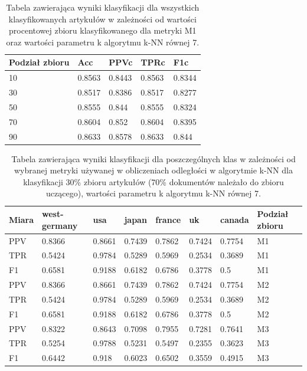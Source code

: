 \documentclass{classrep}
\begin{document}
\begin{table}[H]
    \centering
\caption{Tabela zawierająca wyniki klasyfikacji dla wszystkich klasyfikowanych artykułów w zależności od wartości procentowej zbioru
klasyfikowanego dla metryki M1 oraz wartości parametru k algorytmu k-NN równej 7.}
\begin{adjustbox}{max width=\textwidth}
    \begin{tabular}{|l|l|l|l|l|}
    \hline
        Podział zbioru & Acc & PPVc & TPRc & F1c \\ \hline
        10 & 0.8563 & 0.8443 & 0.8563 & 0.8344 \\ \hline
        30 & 0.8517 & 0.8386 & 0.8517 & 0.8277 \\ \hline
        50 & 0.8555 & 0.844 & 0.8555 & 0.8324 \\ \hline
        70 & 0.8604 & 0.852 & 0.8604 & 0.8395 \\ \hline
        90 & 0.8633 & 0.8578 & 0.8633 & 0.844 \\ \hline
    \end{tabular}
\end{adjustbox}
\end{table}

\begin{table}[H]
    \centering
\caption{Tabela zawierająca wyniki klasyfikacji dla poszczególnych klas w zależności od wybranej metryki
używanej w obliczeniach odległości w algorytmie k-NN dla klasyfikacji 30\% zbioru
artykułów (70\% dokumentów należało do zbioru uczącego), wartości parametru k
algorytmu k-NN równej 7.}
\begin{adjustbox}{max width=\textwidth}
    \begin{tabular}{|l|l|l|l|l|l|l|l|}
    \hline
        Miara & west-germany  & usa  & japan & france & uk & canada & Podział zbioru \\ \hline
        PPV & 0.8366 & 0.8661 & 0.7439 & 0.7862 & 0.7424 & 0.7754 & M1 \\ \hline
        TPR & 0.5424 & 0.9784 & 0.5289 & 0.5969 & 0.2534 & 0.3689 & M1 \\ \hline
        F1 & 0.6581 & 0.9188 & 0.6182 & 0.6786 & 0.3778 & 0.5 & M1 \\ \hline
        PPV & 0.8366 & 0.8661 & 0.7439 & 0.7862 & 0.7424 & 0.7754 & M2 \\ \hline
        TPR & 0.5424 & 0.9784 & 0.5289 & 0.5969 & 0.2534 & 0.3689 & M2 \\ \hline
        F1 & 0.6581 & 0.9188 & 0.6182 & 0.6786 & 0.3778 & 0.5 & M2 \\ \hline
        PPV & 0.8322 & 0.8643 & 0.7098 & 0.7955 & 0.7281 & 0.7641 & M3 \\ \hline
        TPR & 0.5254 & 0.9788 & 0.5231 & 0.5497 & 0.2355 & 0.3623 & M3 \\ \hline
        F1 & 0.6442 & 0.918 & 0.6023 & 0.6502 & 0.3559 & 0.4915 & M3 \\ \hline
    \end{tabular}
\end{adjustbox}
\end{table}
\end{document}
